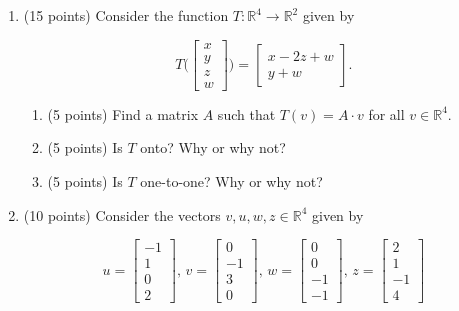 \documentclass[12 pt]{report}
\begin{document}
\newpage

\begin{enumerate}

\item (15 points) Consider the function $T: \mathbb{R}^4 \to \mathbb{R}^2$ given by 

\[
T\Big( \begin{bmatrix} x \\ y \\ z \\ w \end{bmatrix} \Big) = \begin{bmatrix} x-2z + w \\ y + w \end{bmatrix}.
\]

\begin{enumerate} \item (5 points) Find a matrix $A$ such that $T(v) = A \cdot v$ for all $v \in \mathbb{R}^4$. 

\vfill 

\item (5 points) Is $T$ onto? Why or why not?

\vfill

\item (5 points) Is $T$ one-to-one? Why or why not?

\vfill

\end{enumerate} 

\newpage

\item (10 points) Consider the vectors $v, u, w, z \in \mathbb{R}^4$ given by 

\[
u = \begin{bmatrix} -1 \\ 1 \\ 0 \\ 2 \end{bmatrix}, \, v = \begin{bmatrix} 0 \\ -1 \\ 3 \\ 0 \end{bmatrix}, \, w = \begin{bmatrix} 0 \\ 0 \\ -1 \\ -1 \end{bmatrix}, \, z = \begin{bmatrix} 2 \\ 1 \\ -1 \\ 4 \end{bmatrix}
\]


\end{enumerate}
\end{document}
